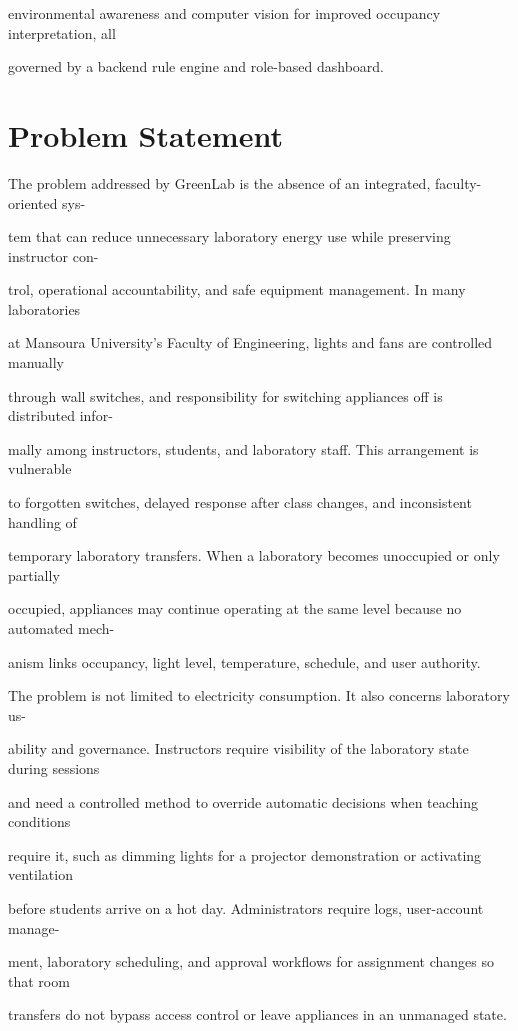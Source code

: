 environmental awareness and computer vision for improved occupancy interpretation, all

governed by a backend rule engine and role-based dashboard.


\section{Problem Statement}
The problem addressed by GreenLab is the absence of an integrated, faculty-oriented sys-

tem that can reduce unnecessary laboratory energy use while preserving instructor con-

trol, operational accountability, and safe equipment management. In many laboratories

at Mansoura University's Faculty of Engineering, lights and fans are controlled manually

through wall switches, and responsibility for switching appliances off is distributed infor-

mally among instructors, students, and laboratory staff. This arrangement is vulnerable

to forgotten switches, delayed response after class changes, and inconsistent handling of

temporary laboratory transfers. When a laboratory becomes unoccupied or only partially

occupied, appliances may continue operating at the same level because no automated mech-

anism links occupancy, light level, temperature, schedule, and user authority.

The problem is not limited to electricity consumption. It also concerns laboratory us-

ability and governance. Instructors require visibility of the laboratory state during sessions

and need a controlled method to override automatic decisions when teaching conditions

require it, such as dimming lights for a projector demonstration or activating ventilation

before students arrive on a hot day. Administrators require logs, user-account manage-

ment, laboratory scheduling, and approval workﬂows for assignment changes so that room

transfers do not bypass access control or leave appliances in an unmanaged state.

